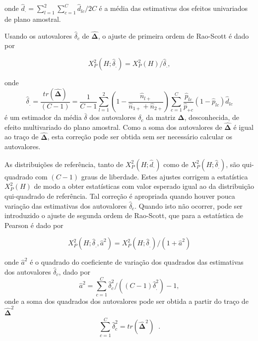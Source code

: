 \documentclass[]{book}
\theoremstyle{definition}
\theoremstyle{definition}
\theoremstyle{definition}
\theoremstyle{remark}
\begin{document}
onde
\(\hat{d}_{\cdot }=\sum\limits_{l=1}^{2}\sum\limits_{c=1}^{C}\hat{d} _{lc}/2C\)
é a média das estimativas dos efeitos univariados de plano amostral.

Usando os autovalores \(\hat{\delta}_{c}\) de \(\mathbf{\hat{\Delta}}\),
o ajuste de primeira ordem de Rao-Scott é dado por

\begin{equation}
X_{P}^{2}\left( H;\hat{\delta}_{.}\right) =X_{P}^{2}\left( H\right) /\hat{
\delta}_{.},  \label{eq:Tab8}
\end{equation}

onde \[
\hat{\delta}_{.}=\frac{tr\left( \mathbf{\hat{\Delta}}\right) }{\left(
C-1\right) }=\frac{1}{C-1}\sum\limits_{l=1}^{2}\left( 1-\frac{\widehat{n}
_{l+}}{\widehat{n}_{1+}+\widehat{n}_{2+}}\right) \sum\limits_{c=1}^{C}\frac{
\hat{p}_{lc}}{\hat{p}_{+c}}\left( 1-\hat{p}_{lc}\right) \hat{d}_{lc} 
\] é um estimador da média \(\bar{\delta}\) dos autovalores
\(\delta _{c}\) da matriz \(\mathbf{\Delta }\), desconhecida, de efeito
multivariado do plano amostral. Como a soma dos autovalores de
\(\mathbf{\hat{\Delta}}\) é igual ao traço de \(\mathbf{\hat{\Delta}}\),
esta correção pode ser obtida sem ser necessário calcular os
autovalores.

As distribuições de referência, tanto de
\(X_{P}^{2}\left( H;\hat{ d}_{\cdot }\right)\) como de
\(X_{P}^{2}\left( H;\hat{\delta}_{.}\right)\), são qui-quadrado com
\(\left( C-1\right)\) graus de liberdade. Estes ajustes corrigem a
estatística \(X_{P}^{2}\left( H\right)\) de modo a obter estatísticas
com valor esperado igual ao da distribuição qui-quadrado de referência.
Tal correção é apropriada quando houver pouca variação das estimativas
dos autovalores \(\hat{\delta} _{c}\). Quando isto não ocorrer, pode ser
introduzido o ajuste de segunda ordem de Rao-Scott, que para a
estatística de Pearson é dado por

\begin{equation}
X_{P}^{2}\left( H;\hat{\delta}_{.},\hat{a}^{2}\right) =X_{P}^{2}\left( H;
\hat{\delta}_{.}\right) /\left( 1+\hat{a}^{2}\right)  \label{eq:Tab9}
\end{equation}

onde \(\hat{a}^{2}\) é o quadrado do coeficiente de variação dos
quadrados das estimativas dos autovalores \(\hat{\delta}_{c}\), dado por
\[
\hat{a}^{2}=\sum\limits_{c=1}^{C}\hat{\delta}_{c}^{2}/\left( \left(
C-1\right) \hat{\delta}_{.}^{2}\right) -1,
\] onde a soma dos quadrados dos autovalores pode ser obtida a partir do
traço de \(\mathbf{\hat{\Delta}}^{2}\) \[
\sum\limits_{c=1}^{C}\hat{\delta}_{c}^{2}=tr\left( \mathbf{\hat{\Delta}}
^{2}\right) \;\;. 
\]
\end{document}

